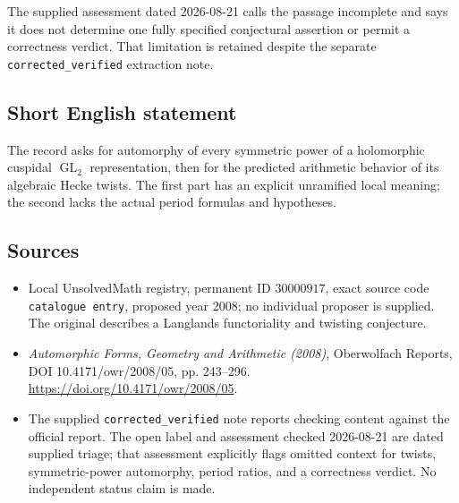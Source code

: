 \documentclass[11pt]{article}
\begin{document}
The supplied assessment dated 2026-08-21 calls the passage incomplete and says it does not determine one fully specified conjectural assertion or permit a correctness verdict. That limitation is retained despite the separate \texttt{corrected\_verified} extraction note.
\subsection{Short English statement}
The record asks for automorphy of every symmetric power of a holomorphic cuspidal \(\operatorname{GL}_2\) representation, then for the predicted arithmetic behavior of its algebraic Hecke twists. The first part has an explicit unramified local meaning; the second lacks the actual period formulas and hypotheses.
\subsection{Sources}
\begin{itemize}
\item Local UnsolvedMath registry, permanent ID \(30000917\), exact source code \texttt{catalogue entry}, proposed year 2008; no individual proposer is supplied. The original describes a Langlands functoriality and twisting conjecture.
\item \emph{Automorphic Forms, Geometry and Arithmetic (2008)}, Oberwolfach Reports, DOI 10.4171/owr/2008/05, pp. 243--296. \url{https://doi.org/10.4171/owr/2008/05}.
\item The supplied \texttt{corrected\_verified} note reports checking content against the official report. The open label and assessment checked 2026-08-21 are dated supplied triage; that assessment explicitly flags omitted context for twists, symmetric-power automorphy, period ratios, and a correctness verdict. No independent status claim is made.
\end{itemize}
\end{document}
